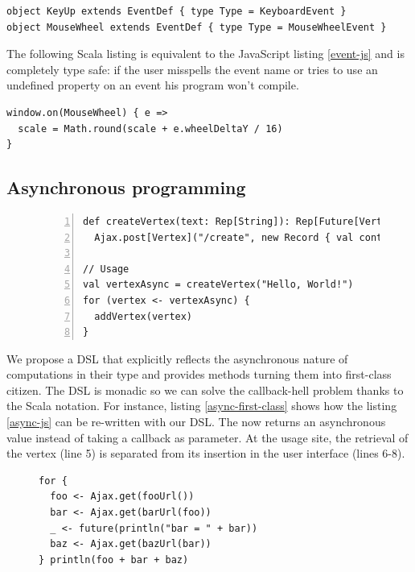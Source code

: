 \documentclass[american,english,runningheads]{llncs}
\begin{document}
\begin{lstlisting}
object KeyUp extends EventDef { type Type = KeyboardEvent }
object MouseWheel extends EventDef { type Type = MouseWheelEvent }
\end{lstlisting}

The following Scala listing is equivalent to the JavaScript listing \ref{event-js} and is completely type safe: if
the user misspells the event name or tries to use an undefined property on an event his program won’t compile.

\begin{lstlisting}
window.on(MouseWheel) { e =>
  scale = Math.round(scale + e.wheelDeltaY / 16)
}
\end{lstlisting}

\subsection{Asynchronous programming}

\begin{figure}
\centering
\begin{lstlisting}[numbers=left,caption=Asynchronous values are first class citizen,label=async-first-class]
def createVertex(text: Rep[String]): Rep[Future[Vertex]] =
  Ajax.post[Vertex]("/create", new Record { val content = text })

// Usage
val vertexAsync = createVertex("Hello, World!")
for (vertex <- vertexAsync) {
  addVertex(vertex)
}
\end{lstlisting}
\end{figure}

We propose a DSL that explicitly reflects the asynchronous nature of computations in their type and provides methods
turning them into first-class citizen. The DSL is monadic so we can solve the callback-hell problem thanks to the
Scala  notation. For instance, listing \ref{async-first-class} shows how the listing \ref{async-js} can be
re-written with our DSL. The  now returns an asynchronous value instead of taking a callback as
parameter. At the usage site, the retrieval of the vertex (line 5) is separated from its insertion in the user
interface (lines 6-8).

\begin{figure}
\centering
\begin{lstlisting}[caption=No callback hell,label=async-no-callback]
for {
  foo <- Ajax.get(fooUrl())
  bar <- Ajax.get(barUrl(foo))
  _ <- future(println("bar = " + bar))
  baz <- Ajax.get(bazUrl(bar))
} println(foo + bar + baz)
\end{lstlisting}
\end{figure}
\end{document}
